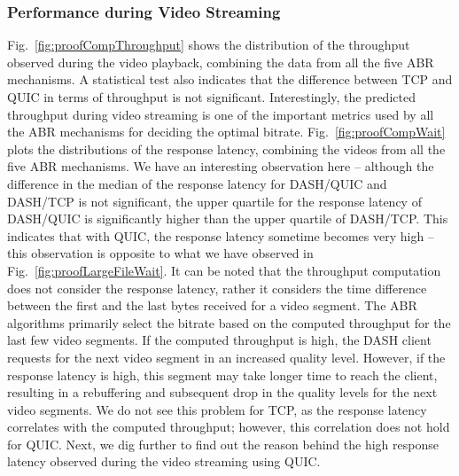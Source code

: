 \subsubsection{Performance during Video Streaming}
Fig.~\ref{fig:proofCompThroughput} shows the distribution of the throughput observed during the video playback, combining the data from all the five ABR mechanisms. A statistical test also indicates that the difference between TCP and QUIC in terms of throughput is not significant. Interestingly, the predicted throughput during video streaming is one of the important metrics used by all the ABR mechanisms for deciding the optimal bitrate. Fig.~\ref{fig:proofCompWait} plots the distributions of the response latency, combining the videos from all the five ABR mechanisms. We have an interesting observation here -- although the difference in the median of the response latency for DASH/QUIC and DASH/TCP is not significant,  the upper quartile for the response latency of DASH/QUIC is significantly higher than the upper quartile of DASH/TCP. This indicates that with QUIC, the response latency sometime becomes very high -- this observation is opposite to what we have observed in Fig.~\ref{fig:proofLargeFileWait}. It can be noted that the throughput computation does not consider the response latency, rather it considers the time difference between the first and the last bytes received for a video segment. The ABR algorithms primarily select the bitrate based on the computed throughput for the last few video segments. If the computed throughput is high, the DASH client requests for the next video segment in an increased quality level. However, if the response latency is high, this segment may take longer time to reach the client, resulting in a rebuffering and subsequent drop in the quality levels for the next video segments. We do not see this problem for TCP, as the response latency correlates with the computed throughput; however, this correlation does not hold for QUIC. Next, we dig further to find out the reason behind the high response latency observed during the video streaming using QUIC. 



